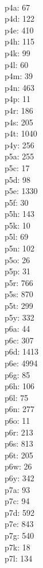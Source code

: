 \begin{multicols}{8}
  \\ p4a: 67
  \\ p4d: 122
  \\ p4e: 410
  \\ p4h: 115
  \\ p4k: 99
  \\ p4l: 60
  \\ p4m: 39
  \\ p4n: 463
  \\ p4p: 11
  \\ p4r: 186
  \\ p4s: 205
  \\ p4t: 1040
  \\ p4y: 256
  \\ p5a: 255
  \\ p5c: 17
  \\ p5d: 98
  \\ p5e: 1330
  \\ p5f: 30
  \\ p5h: 143
  \\ p5k: 10
  \\ p5l: 69
  \\ p5n: 102
  \\ p5o: 26
  \\ p5p: 31
  \\ p5r: 766
  \\ p5s: 870
  \\ p5t: 299
  \\ p5y: 332
  \\ p6a: 44
  \\ p6c: 307
  \\ p6d: 1413
  \\ p6e: 4994
  \\ p6g: 85
  \\ p6h: 106
  \\ p6l: 75
  \\ p6n: 277
  \\ p6o: 11
  \\ p6r: 213
  \\ p6s: 813
  \\ p6t: 205
  \\ p6w: 26
  \\ p6y: 342
  \\ p7a: 93
  \\ p7c: 94
  \\ p7d: 592
  \\ p7e: 843
  \\ p7g: 540
  \\ p7k: 18
  \\ p7l: 134

\end{multicols}
